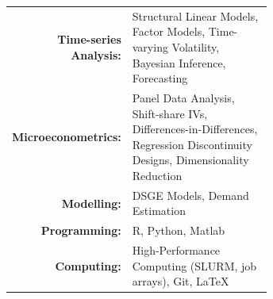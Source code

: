 \documentclass[
	10pt, %
]{FreemanCV}
\begin{document}
\begin{paracol}{2}



\begin{supertabular}{r p{0.65\linewidth}}

\textbf{Time-series Analysis:} & Structural Linear Models, Factor Models, Time-varying Volatility, Bayesian Inference, Forecasting \\[4pt]

\textbf{Microeconometrics:} & Panel Data Analysis, Shift-share IVs, Differences-in-Differences, Regression Discontinuity Designs, Dimensionality Reduction \\[4pt]

\textbf{Modelling:} & DSGE Models, Demand Estimation \\[4pt]

\textbf{Programming:} & R, Python, Matlab \\[4pt]

\textbf{Computing:} & High-Performance Computing (SLURM, job arrays), Git, \LaTeX

\vspace{-10em}

\end{supertabular}





\switchcolumn %




\end{paracol}
\end{document}
